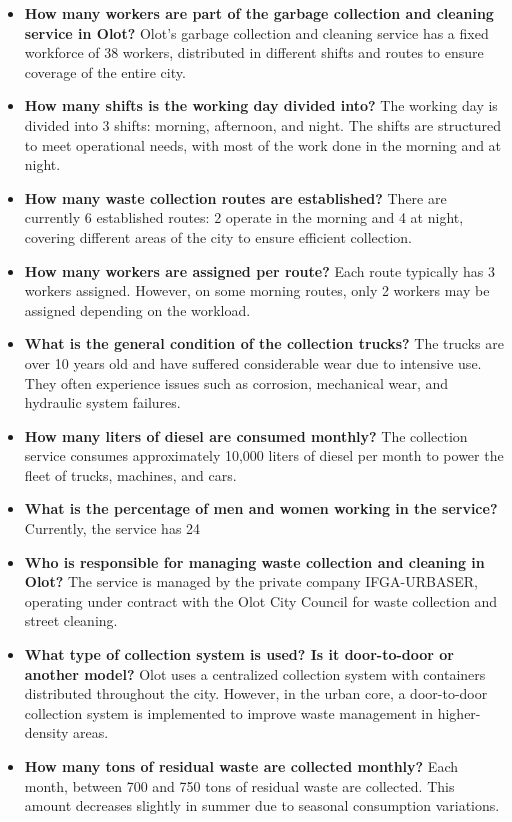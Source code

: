 \begin{itemize}
\item \textbf{How many workers are part of the garbage collection and cleaning service in Olot?}
Olot's garbage collection and cleaning service has a fixed workforce of 38 workers, distributed in different shifts and routes to ensure coverage of the entire city.
\item \textbf{How many shifts is the working day divided into?}
The working day is divided into 3 shifts: morning, afternoon, and night. The shifts are structured to meet operational needs, with most of the work done in the morning and at night.
\item \textbf{How many waste collection routes are established?}
There are currently 6 established routes: 2 operate in the morning and 4 at night, covering different areas of the city to ensure efficient collection.
\item \textbf{How many workers are assigned per route?}
Each route typically has 3 workers assigned. However, on some morning routes, only 2 workers may be assigned depending on the workload.
\item \textbf{What is the general condition of the collection trucks?}
The trucks are over 10 years old and have suffered considerable wear due to intensive use. They often experience issues such as corrosion, mechanical wear, and hydraulic system failures.
\item \textbf{How many liters of diesel are consumed monthly?}
The collection service consumes approximately 10,000 liters of diesel per month to power the fleet of trucks, machines, and cars.
\item \textbf{What is the percentage of men and women working in the service?}
Currently, the service has 24%
\item \textbf{Who is responsible for managing waste collection and cleaning in Olot?}
The service is managed by the private company IFGA-URBASER, operating under contract with the Olot City Council for waste collection and street cleaning.
\item \textbf{What type of collection system is used? Is it door-to-door or another model?}
Olot uses a centralized collection system with containers distributed throughout the city. However, in the urban core, a door-to-door collection system is implemented to improve waste management in higher-density areas.
\item \textbf{How many tons of residual waste are collected monthly?}
Each month, between 700 and 750 tons of residual waste are collected. This amount decreases slightly in summer due to seasonal consumption variations.

\end{itemize}
